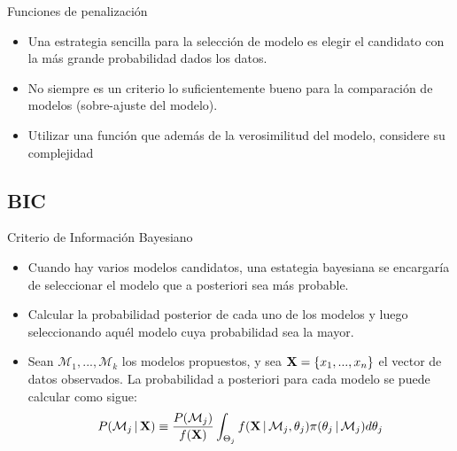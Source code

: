 \begin{frame}{Funciones de penalización}
  \begin{itemize} 
    \itemsep1em
    \item
    Una estrategia sencilla para la selección de modelo es elegir el candidato con la más grande probabilidad dados los datos. 

    \item
    No siempre es un criterio lo suficientemente bueno para la comparación de modelos (sobre-ajuste del modelo). 

    \item 
    Utilizar una función que además de la verosimilitud del modelo, considere su complejidad
  \end{itemize}
\end{frame}    

\subsection{BIC}

\begin{frame}{Criterio de Información Bayesiano}
  \begin{itemize} 
    \itemsep1em
    \item 
    Cuando hay varios modelos candidatos, una estategia bayesiana se encargaría de seleccionar el modelo que a posteriori sea más probable. 

    \item
    Calcular la probabilidad posterior de cada uno de los modelos y luego seleccionando aquél modelo cuya probabilidad sea la mayor.

    \item
    Sean $\mathcal{M}_1, ..., \mathcal{M}_k$ los modelos propuestos, y sea $\textbf{X} = \lbrace x_1, ..., x_n \rbrace $ el vector de datos observados. La probabilidad a posteriori para cada modelo se puede calcular como sigue: 
    \begin{equation}
    P(\mathcal{M}_j \,|\, \textbf{X}) \equiv \frac{P(\mathcal{M}_j)}{f(\textbf{X})} 
      \int_{\Theta_j} f(\textbf{X} \,|\, \mathcal{M}_j, \theta_j) \pi(\theta_j \,|\, \mathcal{M}_j) d\theta_j
    \label{eqn:4-1}
    \end{equation}
  \end{itemize}
\end{frame}    

